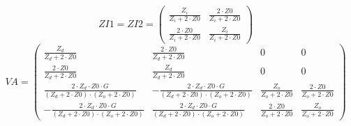 \[ ZI1=ZI2=\left(\begin{smallmatrix} \frac{Z_i}{Z_i+2\cdot Z0} &
\frac{2\cdot Z0}{Z_i+2\cdot Z0} \\ \frac{2\cdot Z0}{Z_i+2\cdot Z0} &
\frac{Z_i}{Z_i+2\cdot Z0} \end{smallmatrix}\right) \]
\[ VA=\left(\begin{smallmatrix} \frac{Z_d}{Z_d+2\cdot Z0} &
\frac{2\cdot Z0}{Z_d+2\cdot Z0} & 0 & 0 \\ \frac{2\cdot Z0}{Z_d+2\cdot
Z0} & \frac{Z_d}{Z_d+2\cdot Z0} & 0 & 0 \\ \frac{2\cdot Z_d\cdot
Z0\cdot G}{\left(Z_d+2\cdot Z0\right)\cdot\left(Z_o+2\cdot Z0\right)}
& -\frac{2\cdot Z_d\cdot Z0\cdot G}{\left(Z_d+2\cdot
Z0\right)\cdot\left(Z_o+2\cdot Z0\right)} & \frac{Z_o}{Z_o+2\cdot Z0}
& \frac{2\cdot Z0}{Z_o+2\cdot Z0} \\ -\frac{2\cdot Z_d\cdot Z0\cdot
G}{\left(Z_d+2\cdot Z0\right)\cdot\left(Z_o+2\cdot Z0\right)} &
\frac{2\cdot Z_d\cdot Z0\cdot G}{\left(Z_d+2\cdot
Z0\right)\cdot\left(Z_o+2\cdot Z0\right)} & \frac{2\cdot
Z0}{Z_o+2\cdot Z0} & \frac{Z_o}{Z_o+2\cdot Z0}
\end{smallmatrix}\right) \]
